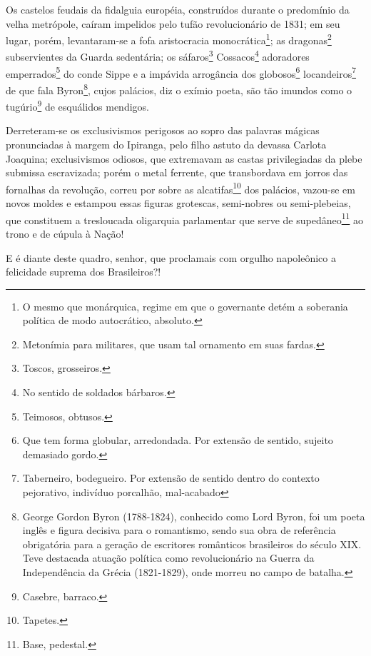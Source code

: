 Os castelos feudais da fidalguia européia, construídos durante o
predomínio da velha metrópole, caíram impelidos pelo tufão
revolucionário de 1831; em seu lugar, porém, levantaram-se a fofa
aristocracia monocrática\footnote{O mesmo que monárquica, regime em
  que o governante detém a soberania política de modo autocrático,
  absoluto.}; as dragonas\footnote{Metonímia para militares, que usam
  tal ornamento em suas fardas.} subservientes da Guarda sedentária; os
sáfaros\footnote{Toscos, grosseiros.} Cossacos\footnote{No sentido
  de soldados bárbaros.} adoradores emperrados\footnote{Teimosos,
  obtusos.} do conde Sippe e a impávida arrogância dos
globosos\footnote{Que tem forma globular, arredondada. Por extensão de
  sentido, sujeito demasiado gordo.} locandeiros\footnote{Taberneiro,
  bodegueiro. Por extensão de sentido dentro do contexto pejorativo,
  indivíduo porcalhão, mal-acabado} de que fala Byron\footnote{George
  Gordon Byron (1788-1824), conhecido como Lord Byron, foi um poeta
  inglês e figura decisiva para o romantismo, sendo sua obra de
  referência obrigatória para a geração de escritores românticos
  brasileiros do século XIX. Teve destacada atuação política como
  revolucionário na Guerra da Independência da Grécia (1821-1829), onde
  morreu no campo de batalha.}, cujos palácios, diz o exímio poeta, são
tão imundos como o tugúrio\footnote{Casebre, barraco.} de esquálidos
mendigos.

Derreteram-se os exclusivismos perigosos ao sopro das palavras mágicas
pronunciadas à margem do Ipiranga, pelo filho astuto da devassa Carlota
Joaquina; exclusivismos odiosos, que extremavam as castas privilegiadas
da plebe submissa escravizada; porém o metal ferrente, que transbordava
em jorros das fornalhas da revolução, correu por sobre as
alcatifas\footnote{Tapetes.} dos palácios, vazou-se em novos moldes e
estampou essas figuras grotescas, semi-nobres ou semi-plebeias, que
constituem a tresloucada oligarquia parlamentar que serve de
supedâneo\footnote{Base, pedestal.} ao trono e de cúpula à Nação!

E é diante deste quadro, senhor, que proclamais com orgulho napoleônico
a felicidade suprema dos Brasileiros?!

